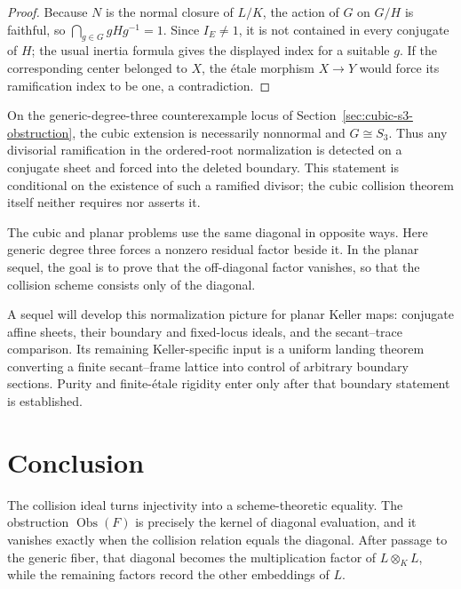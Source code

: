 \documentclass[11pt]{article}
\theoremstyle{remark}
\theoremstyle{definition}
\newcommand{\Obs}{\operatorname{Obs}}
\begin{document}
\begin{proof}
Because \(N\) is the normal closure of \(L/K\), the action of \(G\) on
\(G/H\) is faithful, so \(\bigcap_{g\in G}gHg^{-1}=1\).  Since
\(I_E\neq1\), it is not contained in every conjugate of \(H\); the usual
inertia formula gives the displayed index for a suitable \(g\).  If the
corresponding center belonged to \(X\), the \'etale morphism \(X\to Y\)
would force its ramification index to be one, a contradiction.
\end{proof}

On the generic-degree-three counterexample locus of
Section~\ref{sec:cubic-s3-obstruction}, the cubic extension is necessarily
nonnormal and \(G\cong S_3\).  Thus any
divisorial ramification in the ordered-root normalization is detected on a
conjugate sheet and forced into the deleted boundary.  This statement is
conditional on the existence of such a ramified divisor; the cubic
collision theorem itself neither requires nor asserts it.

The cubic and planar problems use the same diagonal in opposite
ways.  Here generic degree three forces a nonzero residual factor beside
it.  In the planar sequel, the goal is to prove that the off-diagonal
factor vanishes, so that the collision scheme consists only of the
diagonal.

A sequel will develop this normalization picture for planar Keller maps:
conjugate affine sheets, their boundary and fixed-locus ideals, and the
secant--trace comparison.  Its remaining Keller-specific input is a
uniform landing theorem converting a finite secant--frame lattice into
control of arbitrary boundary sections.  Purity and finite-\'etale
rigidity enter only after that boundary statement is established.

\section{Conclusion}
\label{sec:conclusion}

The collision ideal turns injectivity into a scheme-theoretic equality.  The
obstruction \(\Obs(F)\) is precisely the kernel of diagonal evaluation,
and it vanishes exactly when the collision relation equals the diagonal.
After passage to the generic fiber, that diagonal becomes the
multiplication factor of \(L\otimes_KL\), while the remaining factors
record the other embeddings of \(L\).
\end{document}
